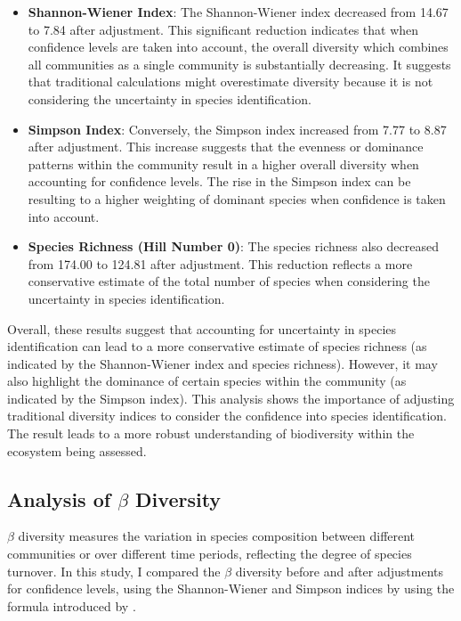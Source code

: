\documentclass[a4paper,12pt]{article}
\begin{document}
\begin{itemize}
    \item \textbf{Shannon-Wiener Index}: The Shannon-Wiener index decreased from 14.67 to 7.84 after adjustment. This significant reduction indicates that when confidence levels are taken into account, the overall diversity which combines all communities as a single community is substantially decreasing. It suggests that traditional calculations might overestimate diversity because it is not considering the uncertainty in species identification.
    
    \item \textbf{Simpson Index}: Conversely, the Simpson index increased from 7.77 to 8.87 after adjustment. This increase suggests that the evenness or dominance patterns within the community result in a higher overall diversity when accounting for confidence levels. The rise in the Simpson index can be resulting to a higher weighting of dominant species when confidence is taken into account.
    
    \item \textbf{Species Richness (Hill Number 0)}: The species richness also decreased from 174.00 to 124.81 after adjustment. This reduction reflects a more conservative estimate of the total number of species when considering the uncertainty in species identification.
\end{itemize}

Overall, these results suggest that accounting for uncertainty in species identification can lead to a more conservative estimate of species richness (as indicated by the Shannon-Wiener index and species richness). However, it may also highlight the dominance of certain species within the community (as indicated by the Simpson index). This analysis shows the importance of adjusting traditional diversity indices to consider the confidence into species identification. The result leads to a more robust understanding of biodiversity within the ecosystem being assessed.

\subsection{Analysis of $\beta$ Diversity}

$\beta$ diversity measures the variation in species composition between different communities or over different time periods, reflecting the degree of species turnover. In this study, I compared the $\beta$ diversity before and after adjustments for confidence levels, using the Shannon-Wiener and Simpson indices by using the formula introduced by \cite{jost2010independence}.
\end{document}
